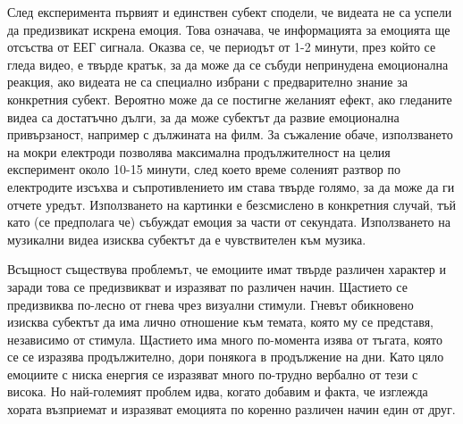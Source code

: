 \documentclass[main.tex]{subfiles}
\begin{document}
След експеримента първият и единствен субект сподели, че видеата не са успели да предизвикат искрена емоция. Това означава, че информацията за емоцията ще отсъства от ЕЕГ сигнала. Оказва се, че периодът от 1-2 минути, през който се гледа видео, е твърде кратък, за да може да се събуди непринудена емоционална реакция, ако видеата не са специално избрани с предварително знание за конкретния субект. Вероятно може да се постигне желаният ефект, ако гледаните видеа са достатъчно дълги, за да може субектът да развие емоционална привързаност, например с дължината на филм. За съжаление обаче, използването на мокри електроди позволява максимална продължителност на целия експеримент около 10-15 минути, след което време соленият разтвор по електродите изсъхва и съпротивлението им става твърде голямо, за да може да ги отчете уредът. Използването на картинки е безсмислено в конкретния случай, тъй като (се предполага че) събуждат емоция за части от секундата. Използването на музикални видеа изисква субектът да е чувствителен към музика. 

Всъщност съществува проблемът, че емоциите имат твърде различен характер и заради това се предизвикват и изразяват по различен начин. Щастието се предизвиква по-лесно от гнева чрез визуални стимули. Гневът обикновено изисква субектът да има лично отношение към темата, която му се представя, независимо от стимула. Щастието има много по-момента изява от тъгата, която се се изразява продължително, дори понякога в продължение на дни. Като цяло емоциите с ниска енергия се изразяват много по-трудно вербално от тези с висока. Но най-големият проблем идва, когато добавим и факта, че изглежда хората възприемат и изразяват емоцията по коренно различен начин един от друг.
\end{document}
